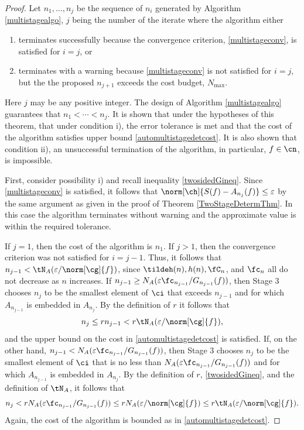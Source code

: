 \documentclass[]{elsarticle}
\theoremstyle{definition}
\theoremstyle{remark}
\begin{document}
\begin{proof} Let $n_1, \ldots, n_{j}$ be the sequence of $n_i$ generated by Algorithm \ref{multistagealgo}, $j$ being the number of the iterate where the algorithm either 
\begin{enumerate}
\renewcommand{\labelenumi}{\roman{enumi})}
\item terminates successfully because the convergence criterion, \eqref{multistageconv}, is satisfied for $i=j$, or 

\item terminates with a warning because \eqref{multistageconv} is not satisfied for $i=j$, but the the proposed $n_{j+1}$ exceeds the cost budget, $N_{\max}$. 

\end{enumerate}
Here $j$ may be any positive integer.  The design of Algorithm \ref{multistagealgo} guarantees that $n_1 < \cdots < n_j$.  It is shown that under the hypotheses of this theorem, that under condition i), the error tolerance is met and that the cost of the algorithm satisfies upper bound \eqref{automultistagedetcost}. It is also shown that condition ii), an unsuccessful termination of the algorithm, in particular, $f \in \cn$, is impossible.  

First, consider possibility i) and recall inequality \eqref{twosidedGineq}.
Since \eqref{multistageconv} is satisfied, it follows that $\norm[\ch]{S(f)-A_{n_j}(f)} \le \varepsilon$ by the same argument as given in the proof of Theorem \ref{TwoStageDetermThm}.  In this case the algorithm terminates without warning and the approximate value is within the required tolerance.

If $j=1$, then the cost of the algorithm is $n_1$.  If $j>1$, then the convergence criterion was not satisfied for $i=j-1$. Thus, it follows that $n_{j-1} < \tN_A(\varepsilon/\norm[\cg]{f})$, since $\tildeh(n), h(n), \fC_n$, and $\fc_n$ all do not decrease as $n$ increases. 
If $n_{j-1} \ge N_{A}(\varepsilon \fc_{n_{j-1}}/G_{n_{j-1}}(f))$, then Stage 3 chooses $n_{j}$ to be the smallest element of $\ci$ that exceeds $n_{j-1}$ and for which $A_{n_{j-1}}$ is embedded in $A_{n_j}$.  By the definition of $r$ it follows that
\begin{equation*}
n_{j} \le r  n_{j-1} < r \tN_{A}(\varepsilon/\norm[\cg]{f}),
\end{equation*}
and the upper bound on the cost in \eqref{automultistagedetcost} is satisfied.
If, on the other hand, $n_{j-1} < N_{A}(\varepsilon \fc_{n_{j-1}}/G_{n_{j-1}}(f))$, then Stage 3 chooses $n_{j}$ to be the smallest element of $\ci$ that is no less than $N_{A}(\varepsilon \fc_{n_{j-1}}/G_{n_{j-1}}(f))$ and for which $A_{n_{j-1}}$ is embedded in $A_{n_j}$.  By the definition of $r$, \eqref{twosidedGineq}, and the definition of $\tN_A$, it follows that
\begin{equation*}
n_{j} < r  N_{A}(\varepsilon \fc_{n_{j-1}}/G_{n_{j-1}}(f)) \le r  N_{A}(\varepsilon/\norm[\cg]{f}) \le r \tN_{A}(\varepsilon/\norm[\cg]{f}).
\end{equation*}
Again, the cost of the algorithm is bounded as in \eqref{automultistagedetcost}.


\end{proof}
\end{document}
